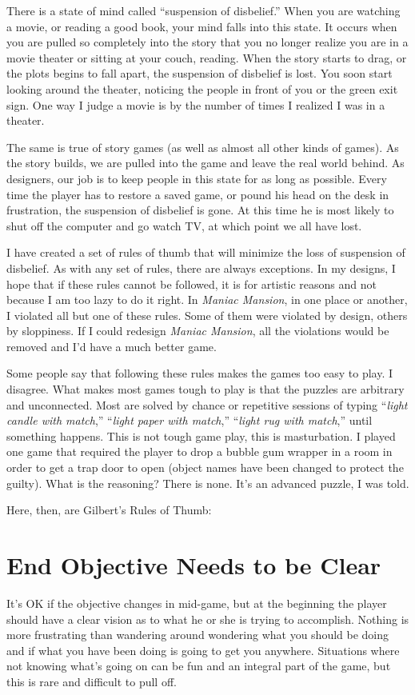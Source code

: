 \documentclass[12pt,letterpaper]{article}
\newcommand{\game}[1]{\textsl{#1}}
\begin{document}
There is a state of mind called ``suspension of disbelief.'' When you are
watching a movie, or reading a good book, your mind falls into this state. It
occurs when you are pulled so completely into the story that you no longer
realize you are in a movie theater or sitting at your couch, reading. When the
story starts to drag, or the plots begins to fall apart, the suspension of
disbelief is lost. You soon start looking around the theater, noticing the
people in front of you or the green exit sign. One way I judge a movie is by
the number of times I realized I was in a theater.

The same is true of story games (as well as almost all other kinds of games).
As the story builds, we are pulled into the game and leave the real world
behind. As designers, our job is to keep people in this state for as long as
possible. Every time the player has to restore a saved game, or pound his head
on the desk in frustration, the suspension of disbelief is gone. At this time
he is most likely to shut off the computer and go watch TV, at which point we
all have lost.

I have created a set of rules of thumb that will minimize the loss of
suspension of disbelief. As with any set of rules, there are always exceptions.
In my designs, I hope that if these rules cannot be followed, it is for
artistic reasons and not because I am too lazy to do it right. In \game{Maniac
Mansion}, in one place or another, I violated all but one of these rules. Some
of them were violated by design, others by sloppiness. If I could redesign
\game{Maniac Mansion}, all the violations would be removed and I'd have a much better
game.

Some people say that following these rules makes the games too easy to play. I
disagree. What makes most games tough to play is that the puzzles are arbitrary
and unconnected. Most are solved by chance or repetitive sessions of typing
``\emph{light candle with match},'' ``\emph{light paper with match},'' ``\emph{light rug with match},''
until something happens. This is not tough game play, this is masturbation. I
played one game that required the player to drop a bubble gum wrapper in a room
in order to get a trap door to open (object names have been changed to protect
the guilty). What is the reasoning? There is none. It's an advanced puzzle, I
was told.

Here, then, are Gilbert's Rules of Thumb:

\section*{End Objective Needs to be Clear} It's OK if the objective changes in
mid-game, but at the beginning the player should have a clear vision as to what
he or she is trying to accomplish. Nothing is more frustrating than wandering
around wondering what you should be doing and if what you have been doing is
going to get you anywhere. Situations where not knowing what's going on can be
fun and an integral part of the game, but this is rare and difficult to pull
off.
\end{document}
